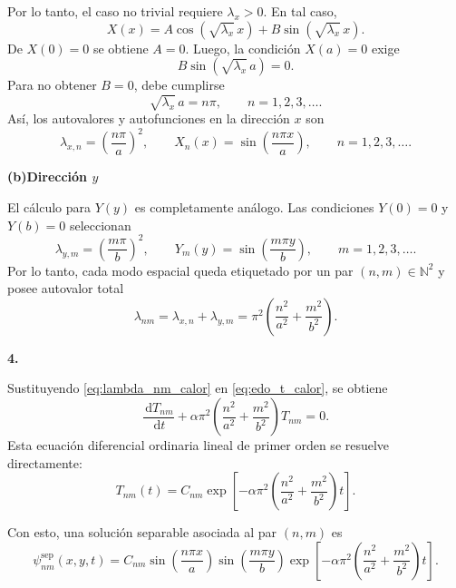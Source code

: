 \documentclass[11pt]{article}
\newcommand{\problema}[2]{%
\vspace{0.55em}
\noindent\textbf{#1.}\enspace{\small #2}\par
\vspace{0.3em}}
\newcommand{\inciso}[1]{%
\vspace{0.35em}
\noindent\textbf{(#1)}\enspace}
\newcommand{\dd}{\,\mathrm{d}}
\newcommand{\N}{\mathbb{N}}
\begin{document}
Por lo tanto, el caso no trivial requiere $\lambda_x>0$. En tal caso,
\begin{equation*}
X(x)=A\cos(\sqrt{\lambda_x}\,x)+B\sin(\sqrt{\lambda_x}\,x).
\end{equation*}
De $X(0)=0$ se obtiene $A=0$. Luego, la condición $X(a)=0$ exige
\begin{equation*}
B\sin(\sqrt{\lambda_x}\,a)=0.
\end{equation*}
Para no obtener $B=0$, debe cumplirse
\begin{equation*}
\sqrt{\lambda_x}\,a=n\pi,
    \qquad n=1,2,3,\ldots.
\end{equation*}
Así, los autovalores y autofunciones en la dirección $x$ son
\begin{equation*}
\lambda_{x,n}=\left(\frac{n\pi}{a}\right)^2,
    \qquad
    X_n(x)=\sin\left(\frac{n\pi x}{a}\right),
    \qquad n=1,2,3,\ldots.
\end{equation*}

\inciso{b}\textbf{Dirección $y$}\par

El cálculo para $Y(y)$ es completamente análogo. Las condiciones $Y(0)=0$ y $Y(b)=0$ seleccionan
\begin{equation*}
\lambda_{y,m}=\left(\frac{m\pi}{b}\right)^2,
    \qquad
    Y_m(y)=\sin\left(\frac{m\pi y}{b}\right),
    \qquad m=1,2,3,\ldots.
\end{equation*}
Por lo tanto, cada modo espacial queda etiquetado por un par $(n,m)\in\N^2$ y posee autovalor total
\begin{equation}
\lambda_{nm}=\lambda_{x,n}+\lambda_{y,m}
    =
    \pi^2\left(\frac{n^2}{a^2}+\frac{m^2}{b^2}\right).
    \label{eq:lambda_nm_calor}
\end{equation}

\problema{4}{Parte temporal}

Sustituyendo \eqref{eq:lambda_nm_calor} en \eqref{eq:edo_t_calor}, se obtiene
\begin{equation*}
\frac{\dd T_{nm}}{\dd t}
    +
    \alpha\pi^2\left(\frac{n^2}{a^2}+\frac{m^2}{b^2}\right)T_{nm}=0.
\end{equation*}
Esta ecuación diferencial ordinaria lineal de primer orden se resuelve directamente:
\begin{equation*}
T_{nm}(t)=C_{nm}\exp\left[-\alpha\pi^2
    \left(\frac{n^2}{a^2}+\frac{m^2}{b^2}\right)t\right].
\end{equation*}

Con esto, una solución separable asociada al par $(n,m)$ es
\begin{equation*}
\psi^{\mathrm{sep}}_{nm}(x,y,t)
    =
    C_{nm}
    \sin\left(\frac{n\pi x}{a}\right)
    \sin\left(\frac{m\pi y}{b}\right)
    \exp\left[-\alpha\pi^2
    \left(\frac{n^2}{a^2}+\frac{m^2}{b^2}\right)t\right].
\end{equation*}
\end{document}
